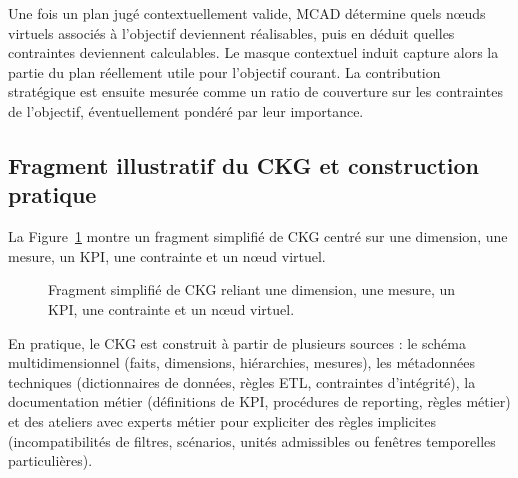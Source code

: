 \documentclass[journal]{IEEEtran}
\begin{document}
Une fois un plan jugé contextuellement valide, MCAD détermine quels nœuds virtuels associés à l'objectif deviennent réalisables, puis en déduit quelles contraintes deviennent calculables. Le masque contextuel induit capture alors la partie du plan réellement utile pour l'objectif courant. La contribution stratégique est ensuite mesurée comme un ratio de couverture sur les contraintes de l'objectif, éventuellement pondéré par leur importance.

\subsection{Fragment illustratif du CKG et construction pratique}

La Figure~\ref{fig:ckg-fragment} montre un fragment simplifié de CKG centré sur une dimension, une mesure, un KPI, une contrainte et un nœud virtuel.

\begin{figure}[!t]
\centering
{}
\caption{Fragment simplifié de CKG reliant une dimension, une mesure, un KPI, une contrainte et un nœud virtuel.}
\label{fig:ckg-fragment}
\end{figure}

En pratique, le CKG est construit à partir de plusieurs sources : le schéma multidimensionnel (faits, dimensions, hiérarchies, mesures), les métadonnées techniques (dictionnaires de données, règles ETL, contraintes d'intégrité), la documentation métier (définitions de KPI, procédures de reporting, règles métier) et des ateliers avec experts métier pour expliciter des règles implicites (incompatibilités de filtres, scénarios, unités admissibles ou fenêtres temporelles particulières).
\end{document}
